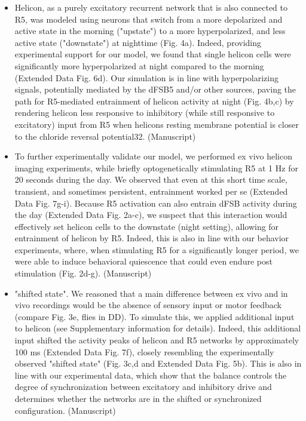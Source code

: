 \documentclass[11pt]{article}
\begin{document}
\begin{itemize}
    \item Helicon, as a purely excitatory recurrent network
    that is also connected to R5, was modeled using neurons that switch from a more depolarized
    and active state in the morning ("upstate") to a more hyperpolarized, and less active state
    ("downstate") at nighttime (Fig. 4a). Indeed, providing experimental support for our model,
    we found that single helicon cells were significantly more hyperpolarized at night compared
    to the morning (Extended Data Fig. 6d). Our simulation is in line with hyperpolarizing signals,
    potentially mediated by the dFSB5 and/or other sources, paving the path for R5-mediated
    entrainment of helicon activity at night (Fig. 4b,c) by rendering helicon less responsive to
    inhibitory (while still responsive to excitatory) input from R5 when helicons resting membrane
    potential is closer to the chloride reversal potential32. 
    \parencite{raccugliaCoherentMultilevelNetwork2022} (Manuscript)

    \item To further experimentally validate our model, we performed ex vivo helicon imaging
    experiments, while briefly optogenetically stimulating R5 at 1 Hz for 20 seconds during the
    day. We observed that even at this short time scale, transient, and sometimes persistent,
    entrainment worked per se (Extended Data Fig. 7g-i). Because R5 activation can also entrain
    dFSB activity during the day (Extended Data Fig. 2a-c), we suspect that this interaction would
    effectively set helicon cells to the downstate (night setting), allowing for entrainment of
    helicon by R5. Indeed, this is also in line with our behavior experiments, where, when
    stimulating R5 for a significantly longer period, we were able to induce behavioral quiescence
    that could even endure post stimulation (Fig. 2d-g).
    \parencite{raccugliaCoherentMultilevelNetwork2022} (Manuscript)

    \item "shifted state". We
    reasoned that a main difference between ex vivo and in vivo recordings would be the absence
    of sensory input or motor feedback (compare Fig. 3e, flies in DD). To simulate this, we applied
    additional input to helicon (see Supplementary information for details). Indeed, this
    additional input shifted the activity peaks of helicon and R5 networks by approximately 100
    ms (Extended Data Fig. 7f), closely resembling the experimentally observed "shifted state" (Fig.
    3c,d and Extended Data Fig. 5b). This is also in line with our experimental data, which show
    that the balance controls the degree of synchronization between excitatory and inhibitory
    drive and determines whether the networks are in the shifted or synchronized configuration.
    \parencite{raccugliaCoherentMultilevelNetwork2022} (Manuscript)


\end{itemize}
\end{document}
